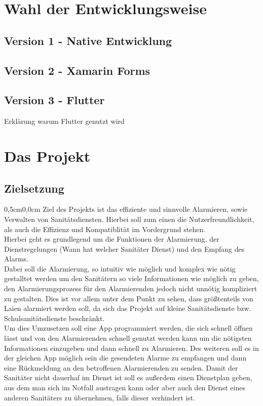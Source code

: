\documentclass{article}
\begin{document}
\section{Wahl der Entwicklungsweise}
    \subsection{Version 1 - Native Entwicklung}
    \subsection{Version 2 - Xamarin Forms}
    \subsection{Version 3 - Flutter}
        Erklärung warum Flutter genutzt wird

\section{Das Projekt}
\subsection{Zielsetzung}
\begin{changemargin}{0,5cm}{0,0cm}
    Ziel des Projekts ist das effiziente und sinnvolle Alarmieren, sowie Verwalten
    von Sanitätsdiensten. Hierbei soll zum einen die Nutzerfreundlichkeit, als auch
    die Effizienz und Kompatiblität im Vordergrund stehen. 
    \\Hierbei geht es grundlegend um die Funktionen der Alarmierung, der Dienstregelungen (Wann hat welcher Sanitäter Dienst) und den Empfang des Alarms.
    \\Dabei soll die Alarmierung, so intuitiv wie möglich und komplex wie nötig gestalltet werden um den Sanitätern so viele
    Informationen wie möglich zu geben, den Alarmierungsprozess für den Alarmierenden jedoch nicht unnötig kompliziert zu gestalten.
    Dies ist vor allem unter dem Punkt zu sehen, dass größtenteils von Laien alarmiert werden soll, da sich das Projekt auf 
    kleine Sanitätsdienste bzw. Schulsanitätsdienste beschränkt.
    \\ Um dies Umzusetzen soll eine App programmiert werden, die sich schnell öffnen lässt und von den Alarmierenden schnell
    genutzt werden kann um die nötigsten Informationen einzugeben und dann schnell zu Alarmieren.
    Des weiteren soll es in der gleichen App möglich sein die gesendeten Alarme zu empfangen und dann eine Rückmeldung an den betroffenen Alarmierenden zu senden.
    Damit der Sanitäter nicht dauerhaf im Dienst ist soll es außerdem einen Dienstplan geben, aus dem man sich im Notfall austragen kann oder aber auch den Dienst 
    eines anderen Sanitäters zu übernehmen, falls dieser verhindert ist.
\end{changemargin}
\end{document}
